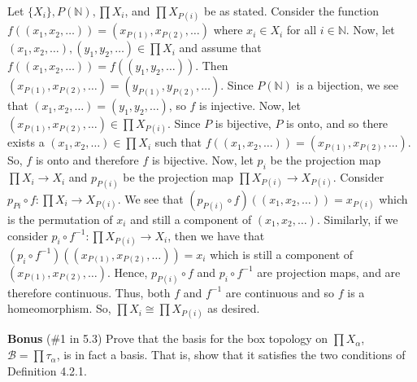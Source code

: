\documentclass[12pt]{article}
\begin{document}
\begin{enumerate}
Let $\{X_i\}, P(\mathbb{N}), \prod X_i$, and $\prod X_{P(i)}$ be as stated. Consider the function $f((x_1, x_2,\ldots))=(x_{P(1)}, x_{P(2)},\dots)$ where $x_i\in X_i$ for all $i\in\mathbb{N}$. Now, let $(x_1, x_2,\ldots), (y_1, y_2,\ldots)\in\prod X_i$ and assume that $f((x_1, x_2,\ldots))=f( (y_1, y_2,\ldots))$. Then $(x_{P(1)}, x_{P(2)},\ldots)=(y_{P(1)}, y_{P(2)},\ldots)$. Since $P(\mathbb{N})$ is a bijection, we see that $(x_1, x_2,\ldots)=(y_1, y_2,\ldots)$, so $f$ is injective. Now, let $(x_{P(1)}, x_{P(2)},\ldots)\in\prod X_{P(i)}$. Since $P$ is bijective, $P$ is onto, and so there exists a $(x_1, x_2,\ldots)\in\prod X_i$ such that $f((x_1, x_2,\ldots))=(x_{P(1)}, x_{P(2)},\ldots)$. So, $f$ is onto and therefore $f$ is bijective. Now, let $p_i$ be the projection map $\prod X_{i}\rightarrow X_{i}$ and $p_{P(i)}$ be the projection map $\prod X_{P(i)}\rightarrow X_{P(i)}$. Consider $p_{P{i}}\circ f:\prod X_i\rightarrow X_{P(i)}$. We see that $(p_{P(i)}\circ f)((x_1, x_2,\ldots))=x_{P(i)}$ which is the permutation of $x_i$ and still a component of $(x_1, x_2,\ldots)$. Similarly, if we consider $p_i\circ f^{-1}:\prod X_{P(i)}\rightarrow X_i$, then we have that $(p_i\circ f^{-1})((x_{P(1)}, x_{P(2)},\ldots))=x_i$ which is still a component of $(x_{P(1)}, x_{P(2)},\ldots)$. Hence, $p_{P(i)}\circ f$ and $p_i\circ f^{-1}$ are projection maps, and are therefore continuous. Thus, both $f$ and $f^{-1}$ are continuous and so $f$ is a homeomorphism. So, $\prod X_i\cong \prod X_{P(i)}$ as desired.


\end{enumerate}

\noindent \textbf{Bonus}  (\#1 in 5.3) Prove that the basis for the box topology on $\prod X_{\alpha}$, $\mathcal{B}=\prod \tau_{\alpha}$, is in fact a basis. That is, show that it satisfies the two conditions of Definition 4.2.1.
\end{document}
